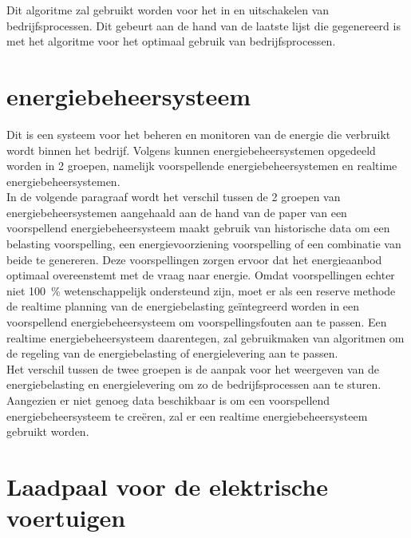Dit algoritme zal gebruikt worden voor het in en uitschakelen van bedrijfsprocessen. Dit gebeurt aan de hand van de laatste lijst die gegenereerd is met het algoritme voor het optimaal gebruik van bedrijfsprocessen.

\section{energiebeheersysteem}
\label{sec:stand-van-zaken-energiebeheersysteem}

Dit is een systeem voor het beheren en monitoren van de energie die verbruikt wordt binnen het bedrijf. Volgens \textcite{FALOPE2024} kunnen energiebeheersystemen opgedeeld worden in 2 groepen, namelijk voorspellende energiebeheersystemen en realtime energiebeheersystemen.\\

In de volgende paragraaf wordt het verschil tussen de 2 groepen van energiebeheersystemen aangehaald aan de hand van de paper van \textcite{FALOPE2024} een voorspellend energiebeheersysteem maakt gebruik van historische data om een belasting voorspelling, een energievoorziening voorspelling of een combinatie van beide te genereren. Deze voorspellingen zorgen ervoor dat het energieaanbod optimaal overeenstemt met de vraag naar energie. Omdat voorspellingen echter niet 100~\% wetenschappelijk ondersteund zijn, moet er als een reserve methode de realtime planning van de energiebelasting geïntegreerd worden in een voorspellend energiebeheersysteem om voorspellingsfouten aan te passen. Een realtime energiebeheersysteem daarentegen, zal gebruikmaken van algoritmen om de regeling van de energiebelasting of energielevering aan te passen.\\

Het verschil tussen de twee groepen is de aanpak voor het weergeven van de energiebelasting en energielevering om zo de bedrijfsprocessen aan te sturen. Aangezien er niet genoeg data beschikbaar is om een voorspellend energiebeheersysteem te creëren, zal er een realtime energiebeheersysteem gebruikt worden.

\section{Laadpaal voor de elektrische voertuigen}
\label{sec:stand-van-zaken-laadpaal}

